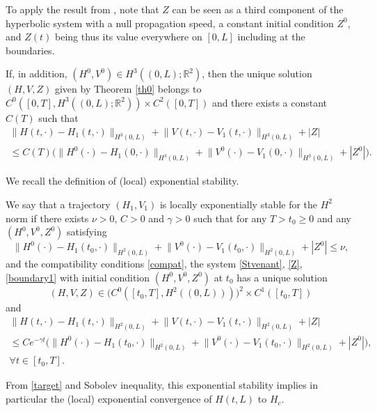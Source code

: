 To apply the result from \cite{Wang}, note that $Z$ can be seen as a third component of the hyperbolic system with a null propagation speed, a constant initial condition $Z^{0}$, and
$Z(t)$ being thus its value everywhere {on $[0,L]$} including at the boundaries.
\begin{rmk}
\label{r0}
If, in addition, $(H^{0},V^{0})\in H^{3}((0,L);\mathbb{R}^{2})$, then the unique solution $(H,V,Z)$ given by Theorem \ref{th0} belongs to $C^{0}([0,T],H^{3}((0,L);\mathbb{R}^{2}))\times C^{2}([0,T])$ and there exists
a constant $C(T)$ such that
\begin{multline}
\lVert H(t,\cdot)-H_{1}(t,\cdot)\rVert_{H^{3}{(0,L)}}+\lVert V(t,\cdot)-V_{1}(t,\cdot)\rVert_{H^{3}{(0,L)}}+|Z|\\
\leq C(T)\bigl(\lVert H^{0}(\cdot)-H_{1}(0,\cdot)\rVert_{H^{3}{(0,L)}}+\lVert V^{0}(\cdot)-V_{1}(0,\cdot)\rVert_{H^{3}{(0,L)}}+|Z^{0}|\bigr).
\end{multline}
\end{rmk}
We recall the definition of {(local)} exponential stability.
\begin{defn}
\label{defexpstab}
We say that a trajectory $(H_{1},V_{1})$ is {locally} exponentially stable for the $H^{2}$ norm if there exists $\nu>0$, $C>0$ and $\gamma>0$ such that for any $T>t_{0}\geq 0$ and any $(H^{0},V^{0},Z^{0})$ satisfying
\begin{equation*}
\lVert H^{0}(\cdot)-H_{1}(t_{0},\cdot)\rVert_{H^{2}(0,L)}+\lVert V^{0}(\cdot)-V_{1}(t_{0},\cdot)\rVert_{H^{2}(0,L)}+|Z^{0}|\leq \nu,
\end{equation*}
and the compatibility conditions \eqref{compat}, the system \eqref{Stvenant}, \eqref{Z}, \eqref{boundary1} {with initial condition $(H^{0},V^{0},Z^{0})$ at $t_{0}$} has a unique solution
\[
(H,V,Z)\in \bigl(C^{0}([t_{0},T],H^{2}((0,L)))\bigr)^{2}\times C^{1}([t_{0},T])
\]
and
\begin{multline*}
\lVert H(t,\cdot)-H_{1}(t,\cdot)\rVert_{H^{2}(0,L)}+\lVert V(t,\cdot)-V_{1}(t,\cdot)\rVert_{H^{2}(0,L)}+|Z|\\
\leq Ce^{-\gamma t}\bigl(\lVert H^{0}(\cdot)-H_{1}(t_{0},\cdot)\rVert_{H^{2}(0,L)}+\lVert V^{0}(\cdot)-V_{1}(t_{0},\cdot)\rVert_{H^{2}(0,L)}+|Z^{0}|\bigr),\\ \forall t\in[t_{0},T].
\end{multline*}
\end{defn}
\begin{rmk}
From \eqref{target} and Sobolev inequality, this exponential stability implies in particular the {(local)} exponential convergence of $H(t,L)$ to $H_{c}$.
\end{rmk}

